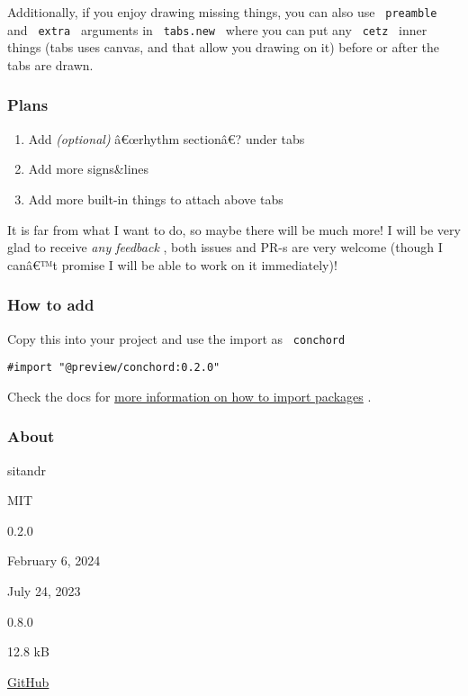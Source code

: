 Additionally, if you enjoy drawing missing things, you can also use
\texttt{\ preamble\ } and \texttt{\ extra\ } arguments in
\texttt{\ tabs.new\ } where you can put any \texttt{\ cetz\ } inner
things (tabs uses canvas, and that allow you drawing on it) before or
after the tabs are drawn.

\subsubsection{Plans}\label{plans}

\begin{enumerate}
\tightlist
\item
  Add \emph{(optional)} â€œrhythm sectionâ€? under tabs
\item
  Add more signs\&lines
\item
  Add more built-in things to attach above tabs
\end{enumerate}

It is far from what I want to do, so maybe there will be much more! I
will be very glad to receive \emph{any feedback} , both issues and PR-s
are very welcome (though I canâ€™t promise I will be able to work on it
immediately)!

\subsubsection{How to add}\label{how-to-add}

Copy this into your project and use the import as \texttt{\ conchord\ }

\begin{verbatim}
#import "@preview/conchord:0.2.0"
\end{verbatim}



Check the docs for
\href{https://typst.app/docs/reference/scripting/\#packages}{more
information on how to import packages} .

\subsubsection{About}\label{about}

\begin{description}
\tightlist
\item[Author :]
sitandr
\item[License:]
MIT
\item[Current version:]
0.2.0
\item[Last updated:]
February 6, 2024
\item[First released:]
July 24, 2023
\item[Minimum Typst version:]
0.8.0
\item[Archive size:]
12.8 kB
\href{https://packages.typst.org/preview/conchord-0.2.0.tar.gz}{\pandocbounded{}}
\item[Repository:]
\href{https://github.com/sitandr/conchord}{GitHub}
\end{description}

